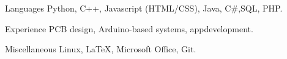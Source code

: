 

\begin{cvskills}

  \cvskill
    {Languages}
    {Python, C++, Javascript (HTML/CSS), Java, C\#,\newline\hspace{-4em}SQL, PHP.}

  \cvskill
  	{Experience}
  	{PCB design, Arduino-based systems, app\newline\hspace{-4em}development.}

  \cvskill
    {Miscellaneous}
    {Linux, \LaTeX, Microsoft Office, Git.}

\end{cvskills}
